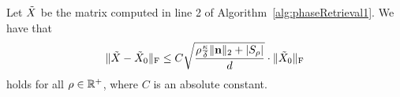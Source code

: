 
\begin{lem}
Let $\tilde{X}$ be the matrix computed in line 2 of Algorithm~\ref{alg:phaseRetrieval1}.  We have that $$\| \tilde{X} - \tilde{X}_0 \|_{\rm F} \leq C \sqrt{\frac{\rho \frac{\kappa}{\delta} \| \mathbf n \|_2 + \left| S_\rho \right|}{d}} \cdot \| \tilde{X}_0 \|_{\rm F}$$
holds for all $\rho \in \mathbb{R}^+$, where $C$ is an absolute constant.
\label{lem:EtaBound}
\end{lem}

